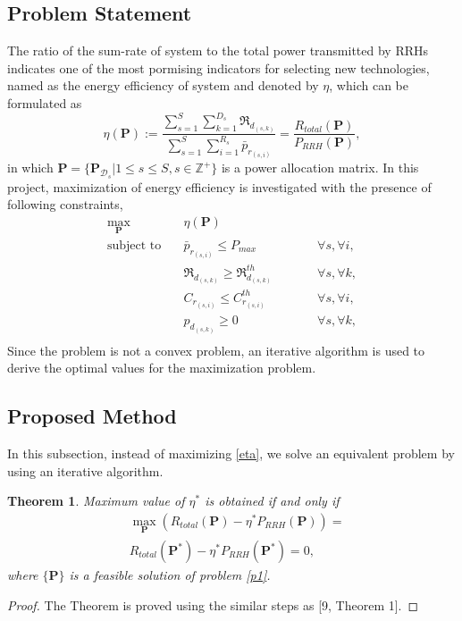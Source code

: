 \documentclass[journal,onecolumn,11pt,draftcls,doublespace]{IEEEtran}
\newtheorem{theorem}{Theorem}
\begin{document}
\subsection{Problem Statement}
The ratio of the sum-rate of system to the total power transmitted by RRHs indicates one of the most pormising indicators for selecting new technologies, named as the energy efficiency of system and denoted by $\eta$, which can be formulated as
\begin{equation}\label{eta}
\eta(\boldsymbol{P}) := \frac{\sum\limits_{s=1}^{S} \sum\limits_{k=1}^{{D}_s}\mathfrak{R}_{d_{(s,k)}} }{\sum\limits_{s=1}^{S} \sum\limits_{i=1}^{{R}_s}\bar{p}_{r_{(s,i)}}} = \frac{R_{total}(\boldsymbol{P})}{P_{RRH}(\boldsymbol{P})},
\end{equation}
in which $ \boldsymbol{P} = \{ \boldsymbol{P}_{\mathcal{D}_s}|  1 \leq s \leq S, s \in \mathbb{Z}^{+} \}$ is a power allocation matrix.
In this project, maximization of energy efficiency is investigated with the presence of following constraints, 
\begin{equation}\label{p1}
\begin{aligned}
\max\limits_{\boldsymbol{P}}   \quad &   \eta(\boldsymbol{P})\\
\text{subject to} \quad  & \bar{p}_{r_{(s,i)}} \leq P_{max} && \qquad \forall s, \forall i,   \\
&\mathfrak{R}_{d_{(s,k)}} \geq  \mathfrak{R}_{d_{(s,k)}}^{th} && \qquad \forall s, \forall k, \\
&C_{r_{(s,i)}} \leq C_{r_{(s,i)}}^{th}  &&\qquad \forall s, \forall i, \\
&p_{d_{(s,k)}}  \geq 0                                  &&\qquad \forall s, \forall k, \\
\end{aligned}			
\end{equation}
Since the problem is not a convex problem, an iterative algorithm is used to derive the optimal values for the maximization problem. 
\subsection{Proposed Method}
In this subsection, instead of maximizing \eqref{eta}, we solve an equivalent problem by using an iterative algorithm. 
\begin{theorem}\label{t2}
Maximum value of $\eta^*$ is obtained if and only if 
\begin{equation}\label{q2}
\begin{split}
&\max \limits_{\boldsymbol{P}} (R_{total}(\boldsymbol{P}) - \eta^* P_{RRH}(\boldsymbol{P}))=\\
& R_{total}(\boldsymbol{P}^*) - \eta^* P_{RRH}(\boldsymbol{P}^*) =0,
\end{split}
\end{equation}
where $\{\boldsymbol{P}\}$ is a feasible solution of problem \eqref{p1}.
\end{theorem}
\begin{proof}
The Theorem is proved using the similar steps as [9, Theorem 1].
\end{proof}
\end{document}
